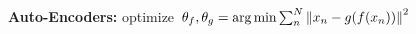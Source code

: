 \textbf{Auto-Encoders:} optimize $\theta_f, \theta_g = \operatorname*{arg\,min} \sum_n^N \left\lVert x_n - g(f(x_n)) \right\rVert ^2$\\

